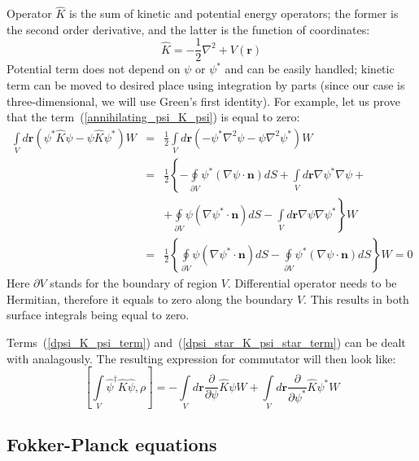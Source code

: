\documentclass[12pt,notitlepage]{report}
\begin{document}
Operator $\hat{K}$ is the sum of kinetic and potential energy operators;
the former is the second order derivative, and the latter is the function of coordinates:
\[ \hat{K} = - \frac{1}{2} \nabla^2 + V(\mathbf{r}) \]
Potential term does not depend on $\psi$ or $\psi^*$ and can be easily handled;
kinetic term can be moved to desired place using integration by parts
(since our case is three-dimensional, we will use Green's first identity).
For example, let us prove that the term~(\ref{annihilating_psi_K_psi}) is equal to zero:
\begin{eqnarray*}
\int\limits_V d\mathbf{r} \left( \psi^* \hat{K} \psi - \psi \hat{K} \psi^* \right) W
& = & \frac{1}{2} \int\limits_V d\mathbf{r} \left( - \psi^* \nabla^2 \psi - \psi \nabla^2 \psi^* \right) W \\
& = & \frac{1}{2} \left\{ - \oint\limits_{\partial V} \psi^* (\nabla \psi \cdot \mathbf{n}) dS +
\int\limits_V d\mathbf{r} \nabla \psi^* \nabla \psi \right. + \\
& & \left. + \oint\limits_{\partial V} \psi (\nabla \psi^* \cdot \mathbf{n}) dS -
\int\limits_V d\mathbf{r} \nabla \psi \nabla \psi^* \right\} W \\
& = & \frac{1}{2} \left\{ \oint\limits_{\partial V} \psi (\nabla \psi^* \cdot \mathbf{n}) dS -
\oint\limits_{\partial V} \psi^* (\nabla \psi \cdot \mathbf{n}) dS \right\} W = 0
\end{eqnarray*}
Here $\partial V$ stands for the boundary of region $V$.
Differential operator needs to be Hermitian, therefore it equals to zero along the boundary $V$.
This results in both surface integrals being equal to zero. 

Terms~(\ref{dpsi_K_psi_term}) and~(\ref{dpsi_star_K_psi_star_term}) can be dealt with analagously.
The resulting expression for commutator will then look like:
\[
[ \int\limits_V \hat{\psi}^\dagger \hat{K} \hat{\psi}, \rho ]  = - \int\limits_V d\mathbf{r} \frac{\partial}{\partial\psi} \hat{K} \psi W +
\int\limits_V d\mathbf{r} \frac{\partial}{\partial\psi^*} \hat{K} \psi^* W
\]

\subsection*{Fokker-Planck equations}
\end{document}
